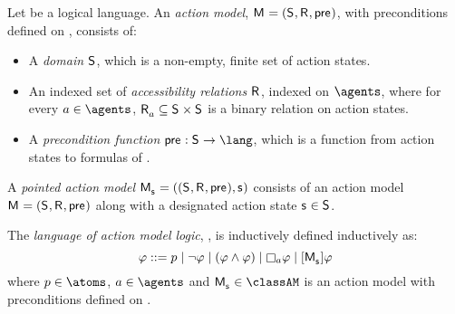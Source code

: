 \begin{definition}
Let \lang{} be a logical language.
An {\em action model}, $\actionModelAndTuple$, with preconditions defined on \lang{}, consists of:
\begin{itemize}
    \item A {\em domain} $\actionStates$, which is a non-empty, finite set of action states.
    \item An indexed set of {\em accessibility relations} $\actionAccessibilityRel$, indexed on $\agents$, where for every $\agentA \in \agents$, $\actionAccessibility{\agentA} \subseteq \actionStates \times \actionStates$ is a binary relation on action states.
    \item A {\em precondition function} $\actionPrecondition : \actionStates \to \lang$, which is a function from action states to formulas of \lang{}.
\end{itemize}
A {\em pointed action model} $\pointedActionModelAndTuple{\actionStateS}$ consists of an action model $\actionModelAndTuple$ along with a designated action state $\actionStateS \in \actionStates$.
\end{definition}

\begin{definition}
The {\em language of action model logic}, \langAml{}, is inductively defined inductively as:
$$
\phi ::= 
    \atomP \mid
    \lnot \phi \mid
    (\phi \land \phi) \mid
    \necessary[\agentA] \phi \mid
    \actionA{\pointedActionModel{\actionStateS}} \phi
$$
where $\atomP \in \atoms$, $\agentA \in \agents$ and $\pointedActionModel{\actionStateS} \in \classAM$ is an action model with preconditions defined on \langAml{}.
\end{definition}


